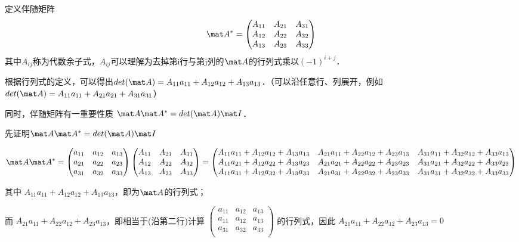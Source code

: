定义伴随矩阵
\begin{equation}
\mat A^*=
\begin{pmatrix}
A_{11}&A_{21}&A_{31}\\
A_{12}&A_{22}&A_{32}\\
A_{13}&A_{23}&A_{33}\\
\end{pmatrix}
\end{equation}
其中$A_{ij}$称为代数余子式，$A_{ij}$可以理解为去掉第i行与第j列的$\mat A$的行列式乘以$(-1)^{i+j}$．

根据行列式的定义，可以得出$det(\mat A) = A_{11}a_{11}+A_{12}a_{12}+A_{13}a_{13}$．（可以沿任意行、列展开，例如$det(\mat A) = A_{11}a_{11}+A_{21}a_{21}+A_{31}a_{31}$）

同时，伴随矩阵有一重要性质 $\mat A \mat A^* = det(\mat A)\mat I$．

先证明$\mat A \mat A^* = det(\mat A)\mat I$

\begin{equation}
\mat A \mat A^* =
\begin{pmatrix}
a_{11}&a_{12}&a_{13}\\
a_{21}&a_{22}&a_{23}\\
a_{31}&a_{32}&a_{33}\\
\end{pmatrix}
\begin{pmatrix}
A_{11}&A_{21}&A_{31}\\
A_{12}&A_{22}&A_{32}\\
A_{13}&A_{23}&A_{33}\\
\end{pmatrix}
=
\begin{pmatrix}
A_{11}a_{11}+A_{12}a_{12}+A_{13}a_{13}&A_{21}a_{11}+A_{22}a_{12}+A_{23}a_{13}&A_{31}a_{11}+A_{32}a_{12}+A_{33}a_{13}\\
A_{11}a_{21}+A_{12}a_{22}+A_{13}a_{23}&A_{21}a_{21}+A_{22}a_{22}+A_{23}a_{23}&A_{31}a_{21}+A_{32}a_{22}+A_{33}a_{23}\\
A_{11}a_{31}+A_{12}a_{32}+A_{13}a_{33}&A_{21}a_{31}+A_{22}a_{32}+A_{23}a_{33}&A_{31}a_{31}+A_{32}a_{32}+A_{33}a_{33}\\
\end{pmatrix}
\end{equation}

其中
$
A_{11}a_{11}+A_{12}a_{12}+A_{13}a_{13}
$，即为$\mat A$的行列式；

而
$
A_{21}a_{11}+A_{22}a_{12}+A_{23}a_{13}
$，即相当于(沿第二行)计算
$
\begin{pmatrix}
a_{11}&a_{12}&a_{13}\\
a_{11}&a_{12}&a_{13}\\
a_{31}&a_{32}&a_{33}\\
\end{pmatrix}
$
的行列式，因此
$
A_{21}a_{11}+A_{22}a_{12}+A_{23}a_{13}=0
$

